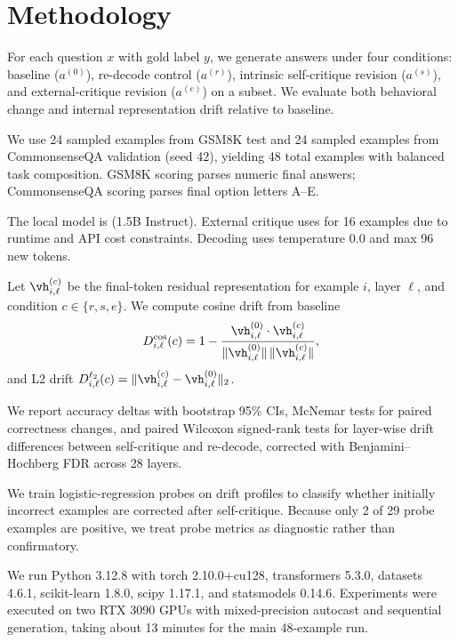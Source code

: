 \section{Methodology}
\label{sec:method}
 For each question $x$ with gold label $y$, we generate answers under four conditions: baseline ($a^{(0)}$), re-decode control ($a^{(r)}$), intrinsic self-critique revision ($a^{(s)}$), and external-critique revision ($a^{(e)}$) on a subset. We evaluate both behavioral change and internal representation drift relative to baseline.

 We use 24 sampled examples from GSM8K test and 24 sampled examples from CommonsenseQA validation (seed 42), yielding 48 total examples with balanced task composition. GSM8K scoring parses numeric final answers; CommonsenseQA scoring parses final option letters A--E.

 The local model is \qwen (1.5B Instruct). External critique uses \gptfourone for 16 examples due to runtime and API cost constraints. Decoding uses temperature 0.0 and max 96 new tokens.

 Let $\vh^{(c)}_{i,\ell}$ be the final-token residual representation for example $i$, layer $\ell$, and condition $c\in\{r,s,e\}$. We compute cosine drift from baseline
\begin{equation}
D^{\cos}_{i,\ell}(c)=1-\frac{\vh^{(0)}_{i,\ell}\cdot\vh^{(c)}_{i,\ell}}{\|\vh^{(0)}_{i,\ell}\|\,\|\vh^{(c)}_{i,\ell}\|},
\end{equation}
and L2 drift $D^{\ell_2}_{i,\ell}(c)=\|\vh^{(c)}_{i,\ell}-\vh^{(0)}_{i,\ell}\|_2$.

 We report accuracy deltas with bootstrap 95\% CIs, McNemar tests for paired correctness changes, and paired Wilcoxon signed-rank tests for layer-wise drift differences between self-critique and re-decode, corrected with Benjamini--Hochberg FDR across 28 layers.

 We train logistic-regression probes on drift profiles to classify whether initially incorrect examples are corrected after self-critique. Because only 2 of 29 probe examples are positive, we treat probe metrics as diagnostic rather than confirmatory.

 We run Python 3.12.8 with torch 2.10.0+cu128, transformers 5.3.0, datasets 4.6.1, scikit-learn 1.8.0, scipy 1.17.1, and statsmodels 0.14.6. Experiments were executed on two RTX 3090 GPUs with mixed-precision autocast and sequential generation, taking about 13 minutes for the main 48-example run.
